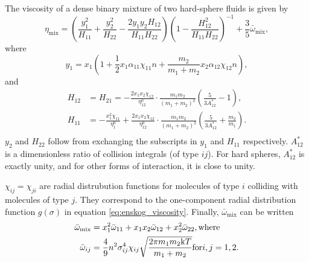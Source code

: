 The viscosity of a dense binary mixture 
of two hard-sphere fluids is given by
\[
    \label{eq:thorne_viscosity}
    \eta_{\text{mix}} 
        = \left(
            \frac{y_1^2}{H_{11}} 
            + \frac{y_2^2}{H_{22}} 
            - \frac{2 y_1 y_2 H_{12}}{H_{11} H_{22}}
        \right)
        \left(
            1 - \frac{H_{12}^2}{H_{11} H_{22}}
        \right)^{-1}
        + \frac{3}{5} \bar{\omega}_{\text{mix}},
\]
where
\[
    y_1 
        = x_1 \left(
            1   + \frac{1}{2} x_1 \alpha_{11} \chi_{11} n 
                + \frac{m_2}{m_1 + m_2} x_2 \alpha_{12} \chi_{12} n
        \right), 
\]
and
\[
    \begin{split}
        H_{12} &= H_{21}
                =   -\frac{2 x_1 x_2 \chi_{12}}{\eta^0_{12}}
                    \cdot \frac{m_1 m_2}{(m_1 + m_2)^2}
                    \left( \frac{5}{3A^*_{12}} - 1 \right), \\
        H_{11}
                &=  -\frac{x_1^2 \chi_{11}}{\eta^0_1}
                    +\frac{2 x_1 x_2 \chi_{12}}{\eta^0_{12}}
                    \cdot \frac{m_1 m_2}{(m_1 + m_2)^2}
                    \left( \frac{5}{3A^*_{12}} + \frac{m_2}{m_1} \right). \\
    \end{split}
\]
$y_2$ and $H_{22}$ follow from exchanging the subscripts in $y_1$ and $H_{11}$ 
respectively.
$A^*_{12}$ is a dimensionless ratio of collision integrals (of type ${ij}$).
For hard spheres, $A^*_{12}$ is exactly unity, and for other forms of 
interaction, it is close to unity. %

$\chi_{ij} = \chi_{ji}$ are radial distrubution 
functions for molecules of type $i$ colliding 
with molecules of type $j$.
They correspond to the one-component radial 
distribution function $g(\sigma)$ in equation 
\eqref{eq:enskog_viscosity}.
Finally, $\bar{\omega}_{\text{mix}}$ can be written
\[
    \begin{split}
        \bar{\omega}_{\text{mix}} 
            &= x_1^2 \bar{\omega}_{11} 
            + x_1 x_2 \bar{\omega}_{12} 
            + x_2^2 \bar{\omega}_{22}, \text{where}\\
        \bar{\omega}_{ij} 
            &= \frac{4}{9} n^2 \sigma_{ij}^4 \chi_{ij} 
            \sqrt{\frac{2\pi m_1 m_2 \mathrm{k} T}{m_1 + m_2}} 
            \text{for} i,j = 1,2.
    \end{split}
\]


